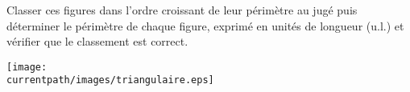 \begin{exercice}
    Classer ces figures dans l'ordre croissant de leur périmètre \og au jugé \fg{} puis déterminer le périmètre de chaque figure, exprimé en unités de longueur (u.l.) et vérifier que le classement est correct.
    \begin{center}
       \texttt{[image: \\currentpath/images/triangulaire.eps]}
    \end{center}
 \end{exercice}